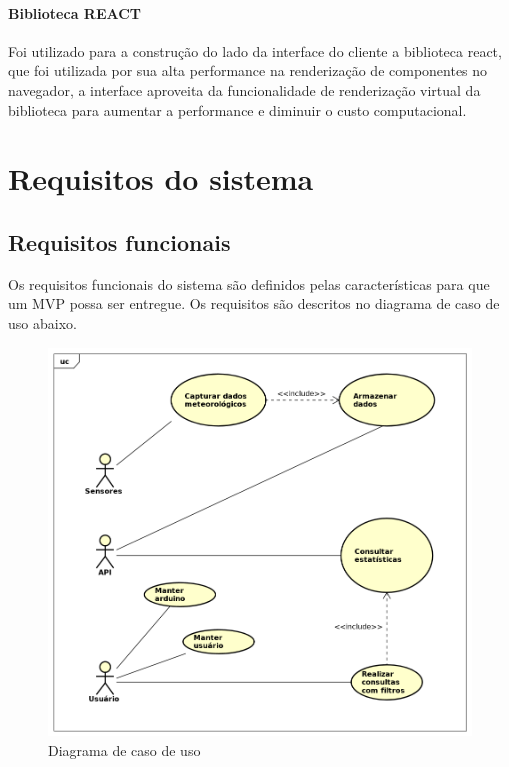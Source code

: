 \subsubsection{Biblioteca REACT}

Foi utilizado para a construção do lado da interface do cliente a biblioteca react, que foi utilizada por sua alta performance na renderização de componentes no navegador, a interface aproveita da funcionalidade de renderização virtual da biblioteca para aumentar a performance e diminuir o custo computacional.

\chapter{Requisitos do sistema}

\section{Requisitos funcionais}

Os requisitos funcionais do sistema são definidos pelas características para que um MVP possa ser entregue.
Os requisitos são descritos no diagrama de caso de uso abaixo.

\begin{figure}[H]
    \label{figure_diagrama_caso_uso}
    \centering
    \caption{Diagrama de caso de uso} \label{includegraphics_diagrama_caso_uso}
    \includegraphics[scale=0.6]{diagrams/caso_de_uso.png}
    \hfill
\end{figure}

